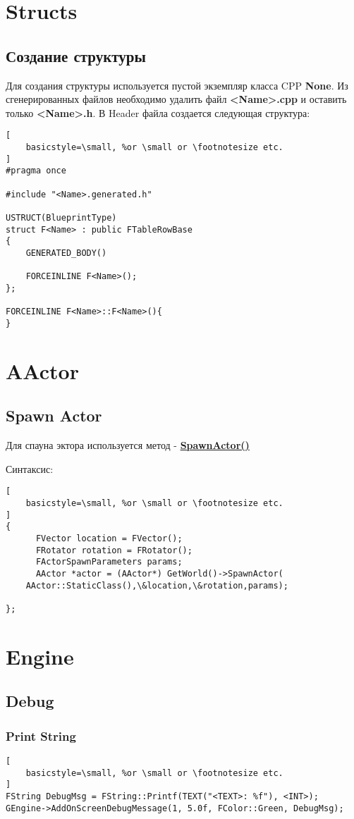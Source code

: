 \documentclass[a4paper,article,14pt]{extarticle}
\begin{document}
\newpage
\section{Structs}
\subsection{Создание структуры}

Для создания структуры используется пустой экземпляр класса CPP \textbf{None}. Из сгенерированных файлов необходимо удалить файл \textbf{<Name>.cpp} и оставить только \textbf{<Name>.h}. В Header файла создается следующая структура:
\\
\lstset{language=C}          
\begin{lstlisting}[
    basicstyle=\small, %or \small or \footnotesize etc.
]              
#pragma once

#include "<Name>.generated.h"

USTRUCT(BlueprintType)
struct F<Name> : public FTableRowBase
{
	GENERATED_BODY()
    
	FORCEINLINE F<Name>();
};

FORCEINLINE F<Name>::F<Name>(){
}
\end{lstlisting}          

\newpage
\section{AActor}
\subsection{Spawn Actor}
Для спауна эктора используется метод - \href{https://docs.unrealengine.com/4.26/en-US/ProgrammingAndScripting/ProgrammingWithCPP/UnrealArchitecture/Actors/Spawning/}{\textbf{SpawnActor()}}

Синтаксис:

\begin{lstlisting}[
    basicstyle=\small, %or \small or \footnotesize etc.
]   
{
      FVector location = FVector();
      FRotator rotation = FRotator();
      FActorSpawnParameters params;
      AActor *actor = (AActor*) GetWorld()->SpawnActor(
	AActor::StaticClass(),\&location,\&rotation,params);
		
};
\end{lstlisting}         

\section{Engine}
\subsection{Debug}
\subsubsection{Print String}
\begin{lstlisting}[
    basicstyle=\small, %or \small or \footnotesize etc.
]   
FString DebugMsg = FString::Printf(TEXT("<TEXT>: %f"), <INT>);
GEngine->AddOnScreenDebugMessage(1, 5.0f, FColor::Green, DebugMsg);
\end{lstlisting}         
\end{document}
